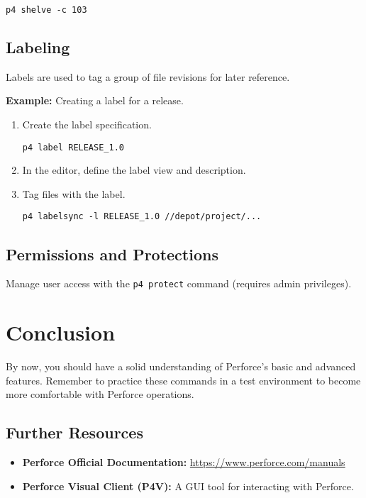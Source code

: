 \documentclass{article}
\begin{document}
\begin{lstlisting}[style=bash]
p4 shelve -c 103
\end{lstlisting}

\subsection{Labeling}

Labels are used to tag a group of file revisions for later reference.

\textbf{Example:} Creating a label for a release.

\begin{enumerate}
    \item Create the label specification.

\begin{lstlisting}[style=bash]
p4 label RELEASE_1.0
\end{lstlisting}

    \item In the editor, define the label view and description.
    \item Tag files with the label.

\begin{lstlisting}[style=bash]
p4 labelsync -l RELEASE_1.0 //depot/project/...
\end{lstlisting}
\end{enumerate}

\subsection{Permissions and Protections}

Manage user access with the \texttt{p4 protect} command (requires admin privileges).

\section{Conclusion}

By now, you should have a solid understanding of Perforce's basic and advanced features. Remember to practice these commands in a test environment to become more comfortable with Perforce operations.

\subsection*{Further Resources}

\begin{itemize}
    \item \textbf{Perforce Official Documentation:} \href{https://www.perforce.com/manuals}{https://www.perforce.com/manuals}
    \item \textbf{Perforce Visual Client (P4V):} A GUI tool for interacting with Perforce.
\end{itemize}
\end{document}
